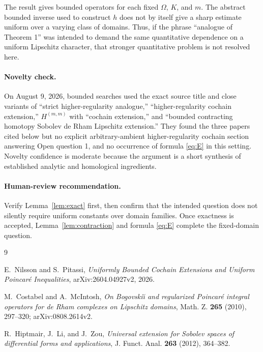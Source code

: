 \documentclass[11pt]{article}
\begin{document}
The result gives bounded operators for each fixed $\Omega$, $K$, and $m$.
The abstract bounded inverse used to construct $h$ does not by itself give a
sharp estimate uniform over a varying class of domains.  Thus, if the phrase
``analogue of Theorem 1'' was intended to demand the same quantitative
dependence on a uniform Lipschitz character, that stronger quantitative
problem is not resolved here.

\paragraph{Novelty check.}
On August 9, 2026, bounded searches used the exact source title and close
variants of ``strict higher-regularity analogue,'' ``higher-regularity
cochain extension,'' $H^{(m,m)}$ with ``cochain extension,'' and ``bounded
contracting homotopy Sobolev de Rham Lipschitz extension.''  They found the
three papers cited below but no explicit arbitrary-ambient higher-regularity
cochain section answering Open question 1, and no occurrence of formula
\eqref{eq:E} in this setting.  Novelty confidence is moderate because the
argument is a short synthesis of established analytic and homological
ingredients.

\paragraph{Human-review recommendation.}
Verify Lemma~\ref{lem:exact} first, then confirm that the intended question
does not silently require uniform constants over domain families.  Once
exactness is accepted, Lemma~\ref{lem:contraction} and formula
\eqref{eq:E} complete the fixed-domain question.

\begin{thebibliography}{9}

E.~Nilsson and S.~Pitassi,
\emph{Uniformly Bounded Cochain Extensions and Uniform Poincar\'e
Inequalities}, arXiv:2604.04927v2, 2026.

M.~Costabel and A.~McIntosh,
\emph{On Bogovski\u{\i} and regularized Poincar\'e integral operators for
de Rham complexes on Lipschitz domains},
Math. Z. \textbf{265} (2010), 297--320; arXiv:0808.2614v2.

R.~Hiptmair, J.~Li, and J.~Zou,
\emph{Universal extension for Sobolev spaces of differential forms and
applications}, J. Funct. Anal. \textbf{263} (2012), 364--382.

\end{thebibliography}
\end{document}
